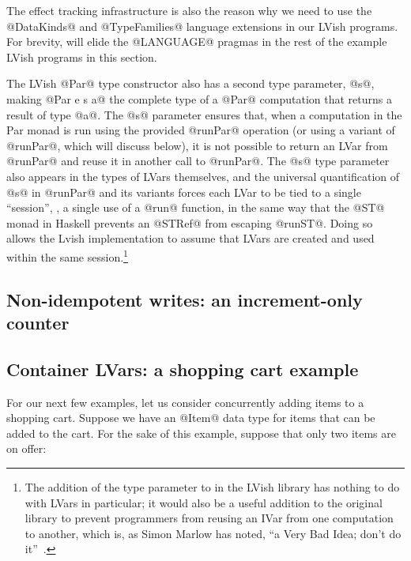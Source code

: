 The effect tracking infrastructure is also the reason why we need to
use the @DataKinds@ and @TypeFamilies@ language extensions in our
LVish programs.  For brevity,  will elide the @LANGUAGE@ pragmas in
the rest of the example LVish programs in this section.  

The LVish @Par@ type constructor also has a second type parameter,
@s@, making @Par e s a@ the complete type of a @Par@ computation that
returns a result of type @a@.  The @s@ parameter ensures that, when a
computation in the Par monad is run using the provided @runPar@
operation (or using a variant of @runPar@, which  will discuss
below), it is not possible to return an LVar from @runPar@ and reuse
it in another call to @runPar@.  The @s@ type parameter also appears
in the types of LVars themselves, and the universal quantification of
@s@ in @runPar@ and its variants forces each LVar to be tied to a
single ``session'', \ie, a single use of a @run@ function, in the same
way that the @ST@ monad in Haskell prevents an @STRef@ from escaping
@runST@.  Doing so allows the Lvish implementation to assume that
LVars are created and used within the same session.\footnote{The
  addition of the  type parameter to  in the LVish
  library has nothing to do with LVars in particular; it would also be
  a useful addition to the original  library to prevent
  programmers from reusing an IVar from one  computation to
  another, which is, as Simon Marlow has noted, ``a Very Bad Idea;
  don't do it''~\cite{marlow-book}.}

\subsection{Non-idempotent writes: an increment-only counter}


\subsection{Container LVars: a shopping cart example}\label{subsection:lvish-container-lvars}

For our next few examples, let us consider concurrently adding items
to a shopping cart.  Suppose we have an @Item@ data type for items
that can be added to the cart.  For the sake of this example, suppose
that only two items are on offer:

